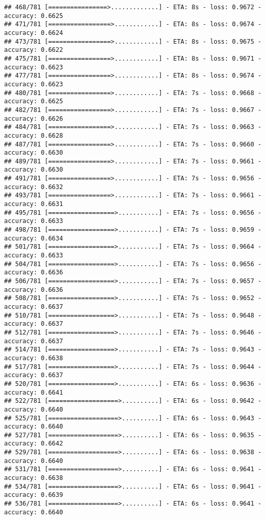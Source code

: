 \documentclass[
]{article}
\begin{document}
\begin{verbatim}
## 468/781 [================>.............] - ETA: 8s - loss: 0.9672 - accuracy: 0.6625
## 471/781 [=================>............] - ETA: 8s - loss: 0.9674 - accuracy: 0.6624
## 473/781 [=================>............] - ETA: 8s - loss: 0.9675 - accuracy: 0.6622
## 475/781 [=================>............] - ETA: 8s - loss: 0.9671 - accuracy: 0.6623
## 477/781 [=================>............] - ETA: 8s - loss: 0.9674 - accuracy: 0.6623
## 480/781 [=================>............] - ETA: 7s - loss: 0.9668 - accuracy: 0.6625
## 482/781 [=================>............] - ETA: 7s - loss: 0.9667 - accuracy: 0.6626
## 484/781 [=================>............] - ETA: 7s - loss: 0.9663 - accuracy: 0.6628
## 487/781 [=================>............] - ETA: 7s - loss: 0.9660 - accuracy: 0.6630
## 489/781 [=================>............] - ETA: 7s - loss: 0.9661 - accuracy: 0.6630
## 491/781 [=================>............] - ETA: 7s - loss: 0.9656 - accuracy: 0.6632
## 493/781 [=================>............] - ETA: 7s - loss: 0.9661 - accuracy: 0.6631
## 495/781 [==================>...........] - ETA: 7s - loss: 0.9656 - accuracy: 0.6633
## 498/781 [==================>...........] - ETA: 7s - loss: 0.9659 - accuracy: 0.6634
## 501/781 [==================>...........] - ETA: 7s - loss: 0.9664 - accuracy: 0.6633
## 504/781 [==================>...........] - ETA: 7s - loss: 0.9656 - accuracy: 0.6636
## 506/781 [==================>...........] - ETA: 7s - loss: 0.9657 - accuracy: 0.6636
## 508/781 [==================>...........] - ETA: 7s - loss: 0.9652 - accuracy: 0.6637
## 510/781 [==================>...........] - ETA: 7s - loss: 0.9648 - accuracy: 0.6637
## 512/781 [==================>...........] - ETA: 7s - loss: 0.9646 - accuracy: 0.6637
## 514/781 [==================>...........] - ETA: 7s - loss: 0.9643 - accuracy: 0.6638
## 517/781 [==================>...........] - ETA: 7s - loss: 0.9644 - accuracy: 0.6637
## 520/781 [==================>...........] - ETA: 6s - loss: 0.9636 - accuracy: 0.6641
## 522/781 [===================>..........] - ETA: 6s - loss: 0.9642 - accuracy: 0.6640
## 525/781 [===================>..........] - ETA: 6s - loss: 0.9643 - accuracy: 0.6640
## 527/781 [===================>..........] - ETA: 6s - loss: 0.9635 - accuracy: 0.6642
## 529/781 [===================>..........] - ETA: 6s - loss: 0.9638 - accuracy: 0.6640
## 531/781 [===================>..........] - ETA: 6s - loss: 0.9641 - accuracy: 0.6638
## 534/781 [===================>..........] - ETA: 6s - loss: 0.9641 - accuracy: 0.6639
## 536/781 [===================>..........] - ETA: 6s - loss: 0.9641 - accuracy: 0.6640

\end{verbatim}
\end{document}
